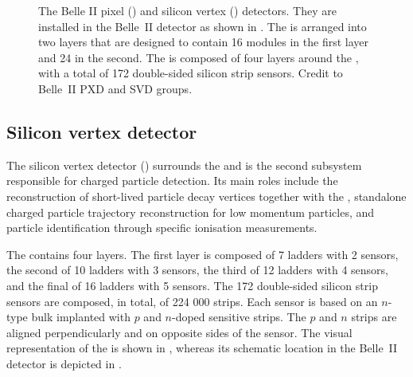 \begin{figure}[htbp!]
    \centering
    \caption{\label{fig:pxd_svd} 
    The Belle II pixel () and silicon vertex () detectors.
    They are installed in the Belle~II detector as shown in .
    The \PXD is arranged into two layers that are designed to contain 16 modules in the first layer and 24 in the second.
    The \SVD is composed of four layers around the \PXD, with a total of 172 double-sided silicon strip sensors.
    Credit to Belle~II PXD and SVD groups.}
\end{figure}

\subsection{Silicon vertex detector}\label{sec:svd}

The silicon vertex detector (\SVD) \cite{Belle-IISVD:2023mxk} surrounds the \PXD and 
is the second subsystem responsible for charged particle detection.
Its main roles include the reconstruction of short-lived particle decay vertices together with the \PXD,
standalone charged particle trajectory reconstruction for low momentum particles,
and particle identification through specific ionisation measurements.

The \SVD contains four layers. 
The first layer is composed of 7 ladders with 2 sensors,
the second of 10 ladders with 3 sensors,
the third of 12 ladders with 4 sensors,
and the final of 16 ladders with 5 sensors.
The 172 double-sided silicon strip sensors are composed, in total, of 224 000 strips.
Each sensor is based on an $n$-type bulk implanted with $p$ and $n$-doped sensitive strips.
The $p$ and $n$ strips are aligned perpendicularly and on opposite sides of the sensor.
The visual representation of the \SVD is shown in , whereas its schematic location in the Belle~II detector is depicted in .

